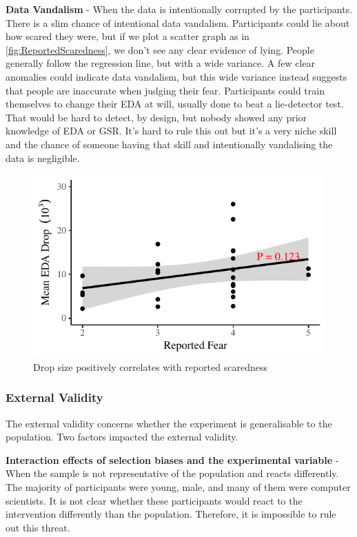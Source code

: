\documentclass[12pt,a4paper]{article}\usepackage[]{graphicx}\usepackage[]{color}
\makeatletter
\def\maxwidth{ %
  \ifdim\Gin@nat@width>\linewidth
    \linewidth
  \else
    \Gin@nat@width
  \fi
}
\makeatother
\begin{document}
\textbf{Data Vandalism} - When the data is intentionally corrupted by the participants.
There is a slim chance of intentional data vandalism.
Participants could lie about how scared they were, but if we plot a scatter graph as in \vref{fig:ReportedScaredness}, we don't see any clear evidence of lying.
People generally follow the regression line, but with a wide variance.
A few clear anomalies could indicate data vandalism, but this wide variance instead suggests that people are inaccurate when judging their fear.
Participants could train themselves to change their EDA at will, usually done to beat a lie-detector test.
That would be hard to detect, by design, but nobody showed any prior knowledge of EDA or GSR.
It's hard to rule this out but it's a very niche skill and the chance of someone having that skill and intentionally vandalising the data is negligible.

\begin{figure}[htb]


{\centering \includegraphics[width=\maxwidth]{figure/ReportedScaredness-1} 

}



	\caption{Drop size positively correlates with reported scaredness}
	\label{fig:ReportedScaredness}
\end{figure}

\subsubsection{External Validity}
The external validity concerns whether the experiment is generalisable to the population.
Two factors impacted the external validity.

\textbf{Interaction effects of selection biases and the experimental variable} - When the sample is not representative of the population and reacts differently.
The majority of participants were young, male, and many of them were computer scientists.
It is not clear whether these participants would react to the intervention differently than the population.
Therefore, it is impossible to rule out this threat.
\end{document}
